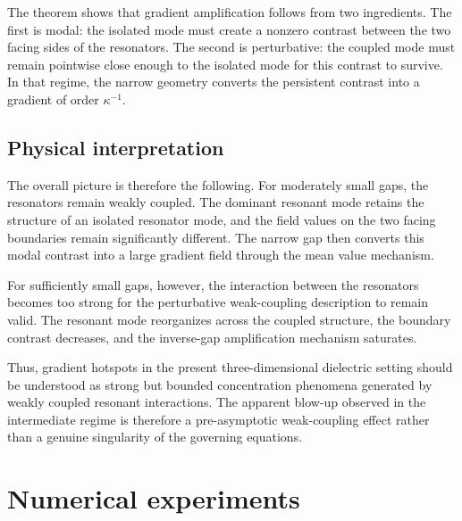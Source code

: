 \documentclass[10pt]{article}
\numberwithin{equation}{section}
\begin{document}
The theorem shows that gradient amplification follows from two ingredients. The first is modal: the isolated mode must create a nonzero contrast between the two facing sides of the resonators. The second is perturbative: the coupled mode must remain pointwise close enough to the isolated mode for this contrast to survive. In that regime, the narrow geometry converts the persistent contrast into a gradient of order $\kappa^{-1}$.










\subsection{Physical interpretation}

The overall picture is therefore the following. For moderately small gaps, the resonators remain weakly coupled. The dominant resonant mode retains the structure of an isolated resonator mode, and the field values on the two facing boundaries remain significantly different. The narrow gap then converts this modal contrast into a large gradient field through the mean value mechanism.

For sufficiently small gaps, however, the interaction between the resonators becomes too strong for the perturbative weak-coupling description to remain valid. The resonant mode reorganizes across the coupled structure, the boundary contrast decreases, and the inverse-gap amplification mechanism saturates.

Thus, gradient hotspots in the present three-dimensional dielectric setting should be understood as strong but bounded concentration phenomena generated by weakly coupled resonant interactions. The apparent blow-up observed in the intermediate regime is therefore a pre-asymptotic weak-coupling effect rather than a genuine singularity of the governing equations.















\section{Numerical experiments}
\label{sec:Numerics}
\end{document}

